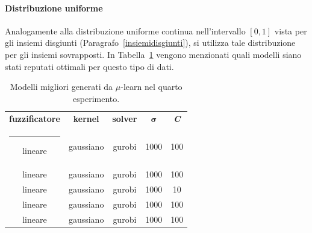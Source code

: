 \documentclass[12pt]{report}
\makeatletter
\theoremstyle{definition}
\newcommand{\thickhline}{%
    \noalign {\ifnum 0=`}\fi \hrule height 1pt
    \futurelet \reserved@a \@xhline
}
\makeatother
\begin{document}
\paragraph{Distribuzione uniforme} Analogamente alla distribuzione uniforme continua nell'intervallo $[0,1]$ vista per gli insiemi disgiunti (Paragrafo~\ref{insiemidisgiunti}), si utilizza tale distribuzione per gli insiemi sovrapposti. In Tabella~\ref{models_exp4} vengono menzionati quali modelli siano stati reputati ottimali per questo tipo di dati.
\begin{table}
\centering
\begin{adjustbox}{max width=\textwidth}
 \begin{tabular}{|c|c|c|c|c|} 
 \hline
\textbf{fuzzificatore} & \textbf{kernel} & \textbf{solver} & $\bm{\sigma}$ & \textit{\textbf{C}}
\\ [0.5ex] 
 \thickhline
 lineare & gaussiano & gurobi & 1000 & 100 \\
 lineare & gaussiano & gurobi & 1000 & 100 \\
 lineare & gaussiano & gurobi & 1000 & 10 \\
 lineare & gaussiano & gurobi & 1000 & 100 \\
 lineare & gaussiano & gurobi & 1000 & 100 \\
 \hline
\end{tabular}
\end{adjustbox}
\caption{Modelli migliori generati da $\mu$-learn nel quarto esperimento.}
\label{models_exp4}
\end{table}
\end{document}
